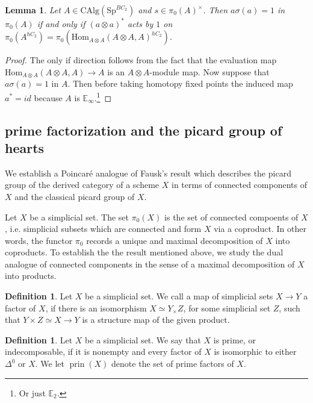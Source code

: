 \documentclass{article}
\newtheorem{lemma}[equation]{Lemma}
\theoremstyle{definition}
\newtheorem{definition}[equation]{Definition}
\newcommand{\Viktor}[1]{\todo{V: #1}}
\begin{document}
\begin{lemma}
	Let $A\in \mathrm{CAlg}(\mathrm{Sp}^{BC_2})$ and $s\in \pi_0(A)^\times$. Then $a\sigma(a)=1$ in $\pi_0(A)$ if and only if $(a\otimes a)^*$ acts by $1$ on $\pi_0(A^{hC_2})=\pi_0(\mathrm{Hom}_{A\otimes A}(A\otimes A, A)^{hC_2})$.
\end{lemma}
\begin{proof}
	The only if direction follows from the fact that the evaluation map $\mathrm{Hom}_{A\otimes A}(A\otimes A, A)\to A$ is an $A\otimes A$-module map. Now suppose that $a\sigma(a)=1$ in  $A$. Then before taking homotopy fixed points the induced map $a^*=id$ because $A$ is $\mathbb{E}_\infty$.\footnote{Or just $\mathbb{E}_2$.} 
\end{proof}

\subsection{prime factorization and the picard group of hearts}\Viktor{still in development}
We establish a Poincaré analogue of Fausk's result which describes the picard group of the derived category of a scheme $X$ in terms of connected components of $X$ and the classical picard group of $X$.

Let $X$ be a simplicial set. The set $\pi_0(X)$ is the set of connected compoents of $X$, i.e. simplicial subsets which are connected and form $X$ via a coproduct. In other words, the functor $\pi_0$ records a unique and maximal decomposition of $X$ into coproducts. To establish the the result mentioned above, we study the dual analogue of connected components in the sense of a maximal decomposition of $X$ into products. %

\begin{definition}\label{definition:factor}
    Let $X$ be a simplicial set. We call a map of simplicial sets $X\rightarrow Y$ a factor of $X$, if there is an isomorphism $X\simeq Y_\times Z$, for some simplicial set $Z$, such that $Y \times Z\simeq X\rightarrow Y$ is a structure map of the given product.
\end{definition}

\begin{definition}\label{definition:prime_indecomposable}
    Let $X$ be a simplicial set. We say that $X$ is prime, or indecomposable, if it is nonempty and every factor of $X$ is isomorphic to  either $\Delta^0$ or $X$. We let $\operatorname{prin}(X)$ denote the set of prime factors of $X$.
\end{definition}
\end{document}
